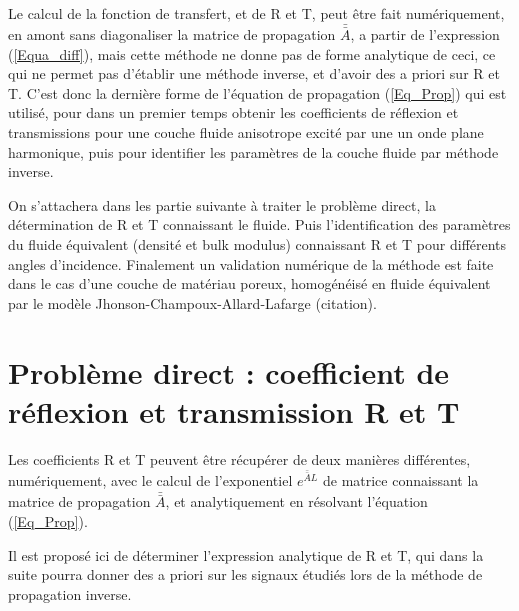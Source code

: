 \documentclass[12pt]{report}
\begin{document}
    Le calcul de la fonction de transfert, et de R et T, peut être fait numériquement, en amont sans diagonaliser la matrice de propagation $\bar{\bar{A}}$, a partir de l'expression (\ref{Equa_diff}), mais cette méthode ne donne pas de forme analytique de ceci, ce qui ne permet pas d'établir une méthode inverse, et d'avoir des a priori sur R et T. C'est donc la dernière forme de l'équation de propagation (\ref{Eq_Prop}) qui est utilisé, pour dans un premier temps obtenir les coefficients de réflexion et transmissions pour une couche fluide anisotrope excité par une un onde plane harmonique, puis pour identifier les paramètres de la couche fluide par méthode inverse.
    
    On s'attachera dans les partie suivante à traiter le problème direct, la détermination de R et T connaissant le fluide. Puis l'identification des paramètres du fluide équivalent (densité et bulk modulus) connaissant R et T pour différents angles d'incidence. Finalement un validation numérique de la méthode est faite dans le cas d'une couche de matériau poreux, homogénéisé en fluide équivalent par le modèle Jhonson-Champoux-Allard-Lafarge (citation). 
    
\chapter{Problème direct : coefficient de réflexion et transmission R et T}
\label{Ch_Dir}
    Les  coefficients R et T peuvent être récupérer de deux manières différentes, numériquement, avec le calcul de l'exponentiel $e^{\bar{\bar{A}}L}$ de matrice connaissant la matrice de propagation $\bar{\bar{A}}$, et analytiquement en résolvant l'équation (\ref{Eq_Prop}).
    
    Il est proposé ici de déterminer l'expression analytique de R et T, qui dans la suite  pourra donner des a priori sur les signaux étudiés lors de la méthode de propagation inverse. 
\end{document}
